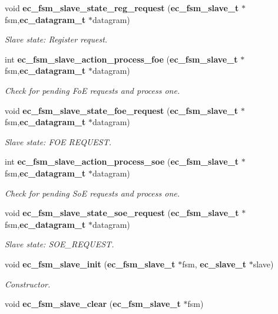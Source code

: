 \begin{DoxyCompactItemize}
void {\bf ec\-\_\-fsm\-\_\-slave\-\_\-state\-\_\-reg\-\_\-request} ({\bf ec\-\_\-fsm\-\_\-slave\-\_\-t} $\ast$fsm,{\bf ec\-\_\-datagram\-\_\-t} $\ast$datagram)
\begin{DoxyCompactList}\small\item\em \-Slave state\-: \-Register request. \end{DoxyCompactList}\item 
int {\bf ec\-\_\-fsm\-\_\-slave\-\_\-action\-\_\-process\-\_\-foe} ({\bf ec\-\_\-fsm\-\_\-slave\-\_\-t} $\ast$fsm,{\bf ec\-\_\-datagram\-\_\-t} $\ast$datagram)
\begin{DoxyCompactList}\small\item\em \-Check for pending \-Fo\-E requests and process one. \end{DoxyCompactList}\item 
void {\bf ec\-\_\-fsm\-\_\-slave\-\_\-state\-\_\-foe\-\_\-request} ({\bf ec\-\_\-fsm\-\_\-slave\-\_\-t} $\ast$fsm,{\bf ec\-\_\-datagram\-\_\-t} $\ast$datagram)
\begin{DoxyCompactList}\small\item\em \-Slave state\-: \-F\-O\-E \-R\-E\-Q\-U\-E\-S\-T. \end{DoxyCompactList}\item 
int {\bf ec\-\_\-fsm\-\_\-slave\-\_\-action\-\_\-process\-\_\-soe} ({\bf ec\-\_\-fsm\-\_\-slave\-\_\-t} $\ast$fsm,{\bf ec\-\_\-datagram\-\_\-t} $\ast$datagram)
\begin{DoxyCompactList}\small\item\em \-Check for pending \-So\-E requests and process one. \end{DoxyCompactList}\item 
void {\bf ec\-\_\-fsm\-\_\-slave\-\_\-state\-\_\-soe\-\_\-request} ({\bf ec\-\_\-fsm\-\_\-slave\-\_\-t} $\ast$fsm,{\bf ec\-\_\-datagram\-\_\-t} $\ast$datagram)
\begin{DoxyCompactList}\small\item\em \-Slave state\-: \-S\-O\-E\-\_\-\-R\-E\-Q\-U\-E\-S\-T. \end{DoxyCompactList}\item 
void {\bf ec\-\_\-fsm\-\_\-slave\-\_\-init} ({\bf ec\-\_\-fsm\-\_\-slave\-\_\-t} $\ast$fsm, {\bf ec\-\_\-slave\-\_\-t} $\ast$slave)
\begin{DoxyCompactList}\small\item\em \-Constructor. \end{DoxyCompactList}\item 
void {\bf ec\-\_\-fsm\-\_\-slave\-\_\-clear} ({\bf ec\-\_\-fsm\-\_\-slave\-\_\-t} $\ast$fsm)

\end{DoxyCompactItemize}
